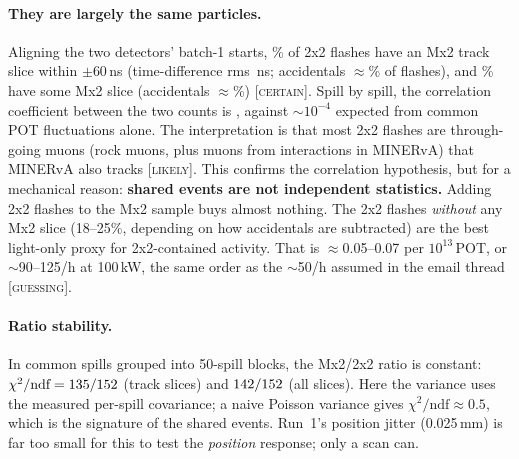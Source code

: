\documentclass[11pt]{article}
\newcommand{\CERT}{\textsc{[certain]}}
\newcommand{\LIK}{\textsc{[likely]}}
\newcommand{\GUESS}{\textsc{[guessing]}}
\begin{document}
\paragraph{They are largely the same particles.} Aligning the two detectors' batch-1 starts,
\CDtrkFrac\% of 2x2 flashes have an Mx2 track slice within $\pm$60\,ns (time-difference
rms \CDtrkDtRms\,ns; accidentals $\approx$\CDtrkAcc\% of flashes), and \CDallFrac\% have some
Mx2 slice (accidentals $\approx$\CDallAcc\%) \CERT. Spill by spill, the correlation coefficient
between the two counts is \CDtrkCorr, against $\sim10^{-4}$ expected from common POT
fluctuations alone. The interpretation is that most 2x2 flashes are through-going muons
(rock muons, plus muons from interactions in MINERvA) that MINERvA also tracks \LIK. This
confirms the correlation hypothesis, but for a mechanical reason: \textbf{shared events
are not independent statistics.} Adding 2x2 flashes to the Mx2 sample buys almost nothing.
The 2x2 flashes \emph{without} any Mx2 slice (18--25\%, depending on how accidentals are
subtracted) are the best light-only proxy for 2x2-contained activity. That is
$\approx$0.05--0.07 per $10^{13}$\,POT, or $\sim$90--125/h at 100\,kW, the same order as the
$\sim$50/h assumed in the email thread \GUESS.

\paragraph{Ratio stability.} In \CDspills{} common spills grouped into 50-spill blocks,
the Mx2/2x2 ratio is constant: $\chi^2/\text{ndf}=135/152$ (track slices) and
$142/152$ (all slices). Here the variance uses the measured per-spill covariance;
a naive Poisson variance gives $\chi^2/\text{ndf}\approx0.5$, which is the signature of the
shared events. Run~1's position jitter (0.025\,mm) is far too small for this to test the
\emph{position} response; only a scan can.
\end{document}
